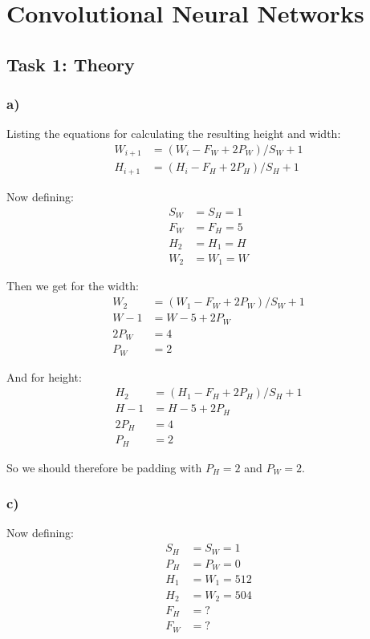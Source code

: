 \section{Convolutional Neural Networks}
\subsection{Task 1: Theory}
\subsubsection*{a)}
Listing the equations for calculating the resulting height and width: 
\begin{align}
    W_{i + 1} &= (W_i - F_W + 2 P_W)/S_W + 1 \\
    H_{i + 1} &= (H_i - F_H + 2 P_H)/S_H + 1
\end{align}

Now defining: 
\begin{align*}
    S_W &= S_H = 1 \\
    F_W &= F_H = 5 \\
    H_2 &= H_1 = H \\
    W_2 &= W_1 = W
\end{align*}

Then we get for the width:
\begin{align*}
    W_2 &= (W_1 - F_W + 2 P_W)/S_W + 1 \\
    W - 1 &= W - 5 + 2 P_W \\
    2 P_W &= 4 \\
    P_W &= 2
\end{align*}

And for height: 
\begin{align*}
    H_2 &= (H_1 - F_H + 2 P_H)/S_H + 1 \\
    H - 1 &= H - 5 + 2 P_H \\
    2 P_H &= 4 \\
    P_H &= 2
\end{align*}

So we should therefore be padding with $P_H = 2$ and $P_W = 2$. 

\subsubsection*{c)}
Now defining: 
\begin{align*}
    S_H &= S_W = 1 \\
    P_H &= P_W = 0 \\
    H_1 &= W_1 = 512 \\
    H_2 &= W_2 = 504 \\
    F_H &= ? \\
    F_W &= ?
\end{align*}

